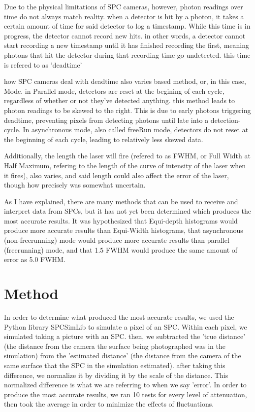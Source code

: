 \documentclass{article}
\begin{document}
Due to the physical limitations of SPC cameras, however, photon readings over time do not always match reality. when a detector is hit by a photon, it takes a certain amount of time for said detector to log a timestamp. While this time is in progress, the detector cannot record new hits. in other words, a detector cannot start recording a new timestamp until it has finished recording the first, meaning photons that hit the detector during that recording time go undetected. this time is refered to as 'deadtime'

how SPC cameras deal with deadtime also varies based method, or, in this case, Mode. in Parallel mode, detectors are reset at the begining of each cycle, regardless of whether or not they've detected anything. this method leads to photon readings to be skewed to the right. This is due to early photons triggering deadtime, preventing pixels from detecting photons until late into a detection-cycle.  In asynchronous mode, also called freeRun mode, detectors do not reset at the beginning of each cycle, leading to relatively less skewed data.

Additionally, the length the laser will fire (refered to as FWHM, or Full Width at Half Maximum, refering to the length of the curve of intensity of the laser when it fires), also varies, and said length could also affect the error of the laser, though how precisely was somewhat uncertain.

As I have explained, there are many methods that can be used to receive and interpret data from SPCs, but it has not yet been determined which produces the most accurate results. It was hypothesized that Equi-depth histograms would produce more accurate results than Equi-Width histograms, that asynchronous (non-freerunning) mode would produce more accurate results than parallel (freerunning) mode, and that 1.5 FWHM would produce the same amount of error as 5.0 FWHM.



\section{Method}
In order to determine what produced the most accurate results, we used the Python library SPCSimLib \cite{SPCSimLib} to simulate a pixel of an SPC. Within each pixel, we simulated taking a picture with an SPC. then, we subtracted the 'true distance' (the distance from the camera the surface being photographed was in the simulation) from the 'estimated distance' (the distance from the camera of the same surface that the SPC in the simulation estimated). after taking this difference, we normalize it by dividing it by the scale of the distance. This normalized difference is what we are referring to when we say 'error'. In order to produce the most accurate results, we ran 10 tests for every level of attenuation, then took the average in order to minimize the effects of fluctuations. 
\end{document}

